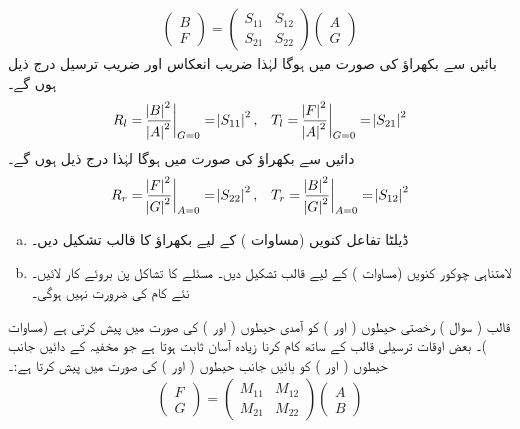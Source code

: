 \begin{align}\label{مساوات_غیر_تابع_شروڈنگر_قالب_بکھراو_بی_ایف}
	\begin{pmatrix}
		B\\
		F
	\end{pmatrix}
	=
	\begin{pmatrix}
		S_{11} & S_{12}\\
		S_{21} & S_{22}
	\end{pmatrix}
	\begin{pmatrix}
		A\\
		G
	\end{pmatrix}
\end{align}
بائیں سے بکھراؤ کی صورت میں   ہوگا لہٰذا ضریب انعکاس  اور ضریب ترسیل درج ذیل ہوں گے۔
\begin{align}\label{مساوات_غیر_تابع_شروڈنگر_آر_ایس}
	R_l=\frac{\abs{B}^2}{\abs{A}^2}\bigg|_{G=0}=\abs{S_{11}}^2,&& T_l=\frac{\abs{F}^2}{\abs{A}^2}\bigg|_{G=0}=\abs{S_{21}}^2
\end{align}
دائیں سے بکھراؤ کی صورت میں   ہوگا لہٰذا درج ذیل ہوں گے۔
\begin{align}\label{مساوات_غیر_تابع_شروڈنگر_آر_ٹی}
	R_r=\frac{\abs{F}^2}{\abs{G}^2}\bigg|_{A=0}=\abs{S_{22}}^2,&& T_r=\frac{\abs{B}^2}{\abs{G}^2}\bigg|_{A=0}=\abs{S_{12}}^2
\end{align}
%
\begin{enumerate}[a.]
\item
 ڈیلٹا تفاعل کنویں (مساوات ) کے لیے بکھراؤ کا قالب   تشکیل دیں۔
\item
 لامتناہی چوکور کنویں (مساوات ) کے لیے قالب   تشکیل دیں۔  مسئلے کا  تشاکل پن بروئے کار لائیں۔ نئے کام کی ضرورت نہیں ہوگی۔ 
\end{enumerate}
 قالب ( سوال )  رخصتی حیطوں (  اور ) کو آمدی حیطوں ( اور ) کی صورت میں پیش کرتی ہے (مساوات )۔ بعض اوقات ترسیلی قالب  کے ساتھ کام کرنا زیادہ آسان ثابت ہوتا ہے جو مخفیہ کے دائیں جانب حیطوں ( اور ) کو بائیں جانب حیطوں ( اور ) کی صورت میں پیش کرتا ہے:۔
\begin{align}
	\begin{pmatrix}
		F\\
		G
	\end{pmatrix}
	=
	\begin{pmatrix}
		M_{11} & M_{12} \\
		M_{21} & M_{22}
	\end{pmatrix}
	\begin{pmatrix}
		A\\
		B
	\end{pmatrix}
\end{align}
